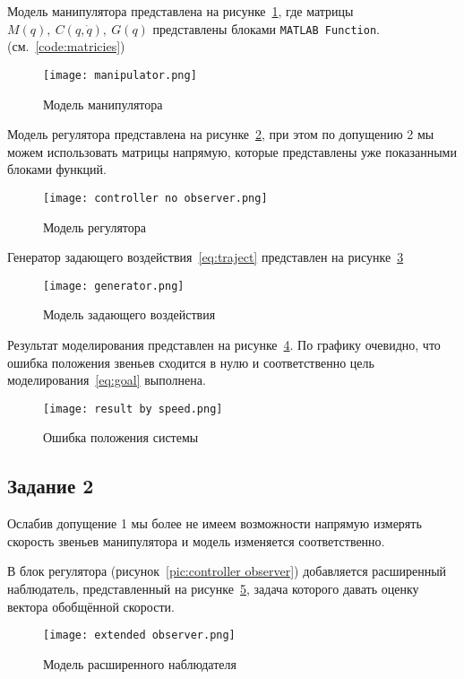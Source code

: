 \documentclass[14pt]{extarticle}
\begin{document}
    \sloppy Модель манипулятора представлена на рисунке~\ref{pic:manipulator}, где матрицы $M(q),\ C(q, \dot{q}),\ G(q)$ представлены блоками
    \texttt{MATLAB Function}. (см.~\ref{code:matricies})
    \begin{figure}[H]
        \centering
        \texttt{[image: manipulator.png]}
        \caption{Модель манипулятора}
        \label{pic:manipulator}
    \end{figure}

    Модель регулятора представлена на рисунке~\ref{pic:controller no observer}, при этом по допущению 2 мы можем использовать
    матрицы напрямую, которые представлены уже показанными блоками функций.
    \begin{figure}[H]
        \centering
        \texttt{[image: controller no observer.png]}
        \caption{Модель регулятора}
        \label{pic:controller no observer}
    \end{figure}

    Генератор задающего воздействия~\eqref{eq:traject} представлен на рисунке~\ref{pic:generator}
    \begin{figure}[H]
        \centering
        \texttt{[image: generator.png]}
        \caption{Модель задающего воздействия}
        \label{pic:generator}
    \end{figure}

    Результат моделирования представлен на рисунке~\ref{pic:result by speed}. По графику очевидно, что ошибка
    положения звеньев сходится в нулю и соответственно цель моделирования~\eqref{eq:goal} выполнена.
    \begin{figure}[H]
        \centering
        \texttt{[image: result by speed.png]}
        \caption{Ошибка положения системы}
        \label{pic:result by speed}
    \end{figure}

    \subsection*{Задание 2}
    Ослабив допущение 1 мы более не имеем возможности напрямую измерять скорость звеньев манипулятора
    и модель изменяется соответственно.

    В блок регулятора (рисунок~\ref{pic:controller observer}) добавляется расширенный наблюдатель,
    представленный на рисунке~\ref{pic:extended observer}, задача которого давать оценку вектора
    обобщённой скорости.
    \begin{figure}[H]
        \centering
        \texttt{[image: extended observer.png]}
        \caption{Модель расширенного наблюдателя}
        \label{pic:extended observer}
    \end{figure}
\end{document}
